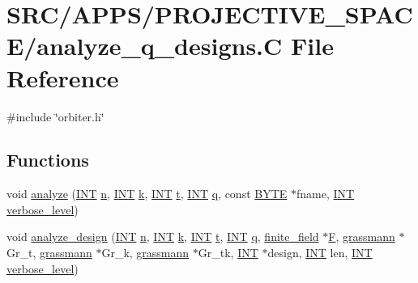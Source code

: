 \hypertarget{analyze__q__designs_8_c}{}\section{S\+R\+C/\+A\+P\+P\+S/\+P\+R\+O\+J\+E\+C\+T\+I\+V\+E\+\_\+\+S\+P\+A\+C\+E/analyze\+\_\+q\+\_\+designs.C File Reference}
\label{analyze__q__designs_8_c}
{\ttfamily \#include \char`\"{}orbiter.\+h\char`\"{}}\newline
\subsection*{Functions}
\begin{DoxyCompactItemize}
\item 
void \mbox{\hyperlink{analyze__q__designs_8_c_a2bb7c896fafb33cfc91cf64d543e5606}{analyze}} (\mbox{\hyperlink{galois_8h_a09fddde158a3a20bd2dcadb609de11dc}{I\+NT}} \mbox{\hyperlink{simeon_8_c_a7f2cd26777ce0ff3fdaf8d02aacbddfb}{n}}, \mbox{\hyperlink{galois_8h_a09fddde158a3a20bd2dcadb609de11dc}{I\+NT}} \mbox{\hyperlink{simeon_8_c_a43fa990200c3ddd47c35f151bd4d66bf}{k}}, \mbox{\hyperlink{galois_8h_a09fddde158a3a20bd2dcadb609de11dc}{I\+NT}} \mbox{\hyperlink{alphabet2_8_c_ac310d9181e916ba43604099aee272c71}{t}}, \mbox{\hyperlink{galois_8h_a09fddde158a3a20bd2dcadb609de11dc}{I\+NT}} \mbox{\hyperlink{simeon_8_c_a92cbb483a3b27ae1a0dbfcb125ce216f}{q}}, const \mbox{\hyperlink{galois_8h_ab6cc7b4aeb6ea31aba2b3fbfc83ff5e6}{B\+Y\+TE}} $\ast$fname, \mbox{\hyperlink{galois_8h_a09fddde158a3a20bd2dcadb609de11dc}{I\+NT}} \mbox{\hyperlink{simeon_8_c_a818073fbcc2f439e7c56952f67386122}{verbose\+\_\+level}})
\item 
void \mbox{\hyperlink{analyze__q__designs_8_c_aeed4daa4f8cfe6d2005bd991432a6305}{analyze\+\_\+design}} (\mbox{\hyperlink{galois_8h_a09fddde158a3a20bd2dcadb609de11dc}{I\+NT}} \mbox{\hyperlink{simeon_8_c_a7f2cd26777ce0ff3fdaf8d02aacbddfb}{n}}, \mbox{\hyperlink{galois_8h_a09fddde158a3a20bd2dcadb609de11dc}{I\+NT}} \mbox{\hyperlink{simeon_8_c_a43fa990200c3ddd47c35f151bd4d66bf}{k}}, \mbox{\hyperlink{galois_8h_a09fddde158a3a20bd2dcadb609de11dc}{I\+NT}} \mbox{\hyperlink{alphabet2_8_c_ac310d9181e916ba43604099aee272c71}{t}}, \mbox{\hyperlink{galois_8h_a09fddde158a3a20bd2dcadb609de11dc}{I\+NT}} \mbox{\hyperlink{simeon_8_c_a92cbb483a3b27ae1a0dbfcb125ce216f}{q}}, \mbox{\hyperlink{classfinite__field}{finite\+\_\+field}} $\ast$\mbox{\hyperlink{simeon_8_c_a21a61c535ff7d9d4b674461d3b19fffa}{F}}, \mbox{\hyperlink{classgrassmann}{grassmann}} $\ast$Gr\+\_\+t, \mbox{\hyperlink{classgrassmann}{grassmann}} $\ast$Gr\+\_\+k, \mbox{\hyperlink{classgrassmann}{grassmann}} $\ast$Gr\+\_\+tk, \mbox{\hyperlink{galois_8h_a09fddde158a3a20bd2dcadb609de11dc}{I\+NT}} $\ast$design, \mbox{\hyperlink{galois_8h_a09fddde158a3a20bd2dcadb609de11dc}{I\+NT}} len, \mbox{\hyperlink{galois_8h_a09fddde158a3a20bd2dcadb609de11dc}{I\+NT}} \mbox{\hyperlink{simeon_8_c_a818073fbcc2f439e7c56952f67386122}{verbose\+\_\+level}})

\end{DoxyCompactItemize}
